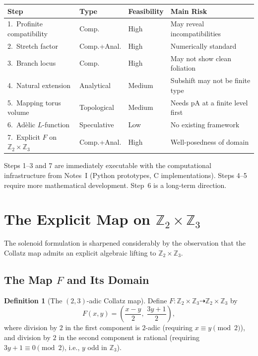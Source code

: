 \documentclass[11pt,a4paper]{article}
\newcommand{\Z}{\mathbb{Z}}
\theoremstyle{plain}
\theoremstyle{definition}
\newtheorem{definition}[theorem]{Definition}
\begin{document}
\begin{center}
\renewcommand{\arraystretch}{1.3}
\small
\begin{tabular}{p{3.8cm}lll}
    \toprule
    \textbf{Step} & \textbf{Type} & \textbf{Feasibility} & \textbf{Main Risk} \\
    \midrule
    1.\ Profinite compatibility & Comp. & High & May reveal incompatibilities \\
    2.\ Stretch factor & Comp.+Anal. & High & Numerically standard \\
    3.\ Branch locus & Comp. & High & May not show clean foliation \\
    4.\ Natural extension & Analytical & Medium & Subshift may not be finite type \\
    5.\ Mapping torus volume & Topological & Medium & Needs pA at a finite level first \\
    6.\ Ad\`elic $L$-function & Speculative & Low & No existing framework \\
    7.\ Explicit $F$ on $\Z_2 \times \Z_3$ & Comp.+Anal. & High & Well-posedness of domain \\
    \bottomrule
\end{tabular}
\end{center}

Steps 1--3 and 7 are immediately executable with the computational infrastructure from Notes~I (Python prototypes, C implementations). Steps 4--5 require more mathematical development. Step~6 is a long-term direction.


\section{The Explicit Map on $\Z_2 \times \Z_3$}\label{sec:explicit-F}

The solenoid formulation is sharpened considerably by the observation that the Collatz map admits an explicit algebraic lifting to $\Z_2 \times \Z_3$.

\subsection{The Map $F$ and Its Domain}

\begin{definition}[The $(2,3)$-adic Collatz map]\label{def:F-map}
    Define $F: \Z_2 \times \Z_3 \dashrightarrow \Z_2 \times \Z_3$ by
    \begin{equation}\label{eq:F-map}
        F(x, y) = \left( \frac{x - y}{2},\; \frac{3y + 1}{2} \right),
    \end{equation}
    where division by $2$ in the first component is $2$-adic (requiring $x \equiv y \pmod{2}$), and division by $2$ in the second component is rational (requiring $3y + 1 \equiv 0 \pmod{2}$, i.e., $y$ odd in $\Z_3$).
\end{definition}
\end{document}
